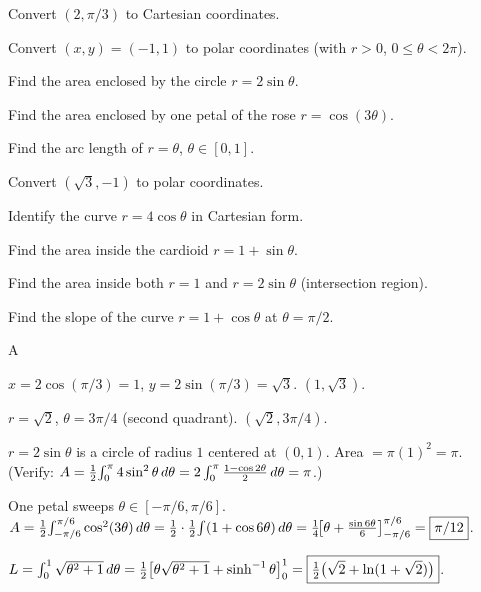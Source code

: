 \documentclass[11pt]{article}
\begin{document}
\begin{problems}
\item Convert $(2, \pi/3)$ to Cartesian coordinates.
\item Convert $(x, y) = (-1, 1)$ to polar coordinates (with $r > 0$, $0 \le \theta < 2\pi$).
\item Find the area enclosed by the circle $r = 2 \sin\theta$.
\item Find the area enclosed by one petal of the rose $r = \cos(3\theta)$.
\item Find the arc length of $r = \theta$, $\theta \in [0, 1]$.
\end{problems}

\vfill
\newpage
{}
\begin{problems}
\item Convert $(\sqrt 3, -1)$ to polar coordinates.
\item Identify the curve $r = 4 \cos\theta$ in Cartesian form.
\item Find the area inside the cardioid $r = 1 + \sin\theta$.
\item Find the area inside both $r = 1$ and $r = 2 \sin\theta$ (intersection region).
\item Find the slope of the curve $r = 1 + \cos\theta$ at $\theta = \pi/2$.
\end{problems}

\vfill
\newpage
{}

\begin{answers}{A}
\item $x = 2 \cos(\pi/3) = 1$, $y = 2 \sin(\pi/3) = \sqrt 3$. $\boxed{(1, \sqrt 3)}$.
\item $r = \sqrt 2$, $\theta = 3\pi/4$ (second quadrant). $\boxed{(\sqrt 2, 3\pi/4)}$.
\item $r = 2\sin\theta$ is a circle of radius $1$ centered at $(0,1)$. Area $= \pi(1)^2 = \boxed{\pi}$. (Verify: $A = \tfrac{1}{2}\!\int_0^\pi 4\sin^2\theta \,d\theta = 2 \int_0^\pi \tfrac{1 - \cos 2\theta}{2} \,d\theta = \pi$.)
\item One petal sweeps $\theta \in [-\pi/6, \pi/6]$. $A = \tfrac{1}{2}\!\int_{-\pi/6}^{\pi/6} \cos^2(3\theta) \,d\theta = \tfrac{1}{2} \cdot \tfrac{1}{2}\!\int (1 + \cos 6\theta)\,d\theta = \tfrac{1}{4}\!\bigl[\theta + \tfrac{\sin 6\theta}{6}\bigr]_{-\pi/6}^{\pi/6} = \boxed{\pi/12}$.
\item $L = \int_0^1 \sqrt{\theta^2 + 1} \,d\theta = \tfrac{1}{2}\bigl[\theta\sqrt{\theta^2+1} + \sinh^{-1}\theta\bigr]_0^1 = \boxed{\tfrac{1}{2}\bigl(\sqrt 2 + \ln(1 + \sqrt 2)\bigr)}$.
\end{answers}
\end{document}
